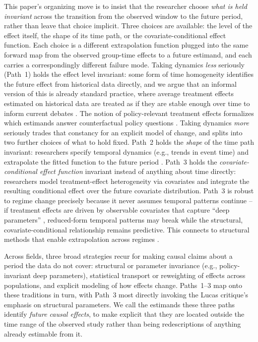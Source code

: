 \documentclass{article}
\begin{document}
This paper's organizing move is to insist that the researcher choose \emph{what is held invariant} across the transition from the observed window to the future period, rather than leave that choice implicit. Three choices are available: the level of the effect itself, the shape of its time path, or the covariate-conditional effect function. Each choice is a different extrapolation function plugged into the same forward map from the observed group-time effects to a future estimand, and each carries a correspondingly different failure mode. Taking dynamics \emph{less} seriously (Path~1) holds the effect level invariant: some form of time homogeneity identifies the future effect from historical data directly, and we argue that an informal version of this is already standard practice, where average treatment effects estimated on historical data are treated as if they are stable enough over time to inform current debates \citep{gablerDealingHeterogeneityTreatment2009,cintronHeterogeneousTreatmentEffects2022}. The notion of policy-relevant treatment effects formalizes which estimands answer counterfactual policy questions \citep{heckmanPolicyRelevantTreatmentEffects2001,sasakiEstimationInferencePolicy2023}. Taking dynamics \emph{more} seriously trades that constancy for an explicit model of change, and splits into two further choices of what to hold fixed. Path~2 holds the \emph{shape} of the time path invariant: researchers specify temporal dynamics (e.g., trends in event time) and extrapolate the fitted function to the future period \citep{khosrowiExtrapolationCausalEffects2019,maebaExtrapolationTreatmentEffect2024}. Path~3 holds the \emph{covariate-conditional effect function} invariant instead of anything about time directly: researchers model treatment-effect heterogeneity via covariates and integrate the resulting conditional effect over the future covariate distribution. Path~3 is robust to regime change precisely because it never assumes temporal patterns continue -- if treatment effects are driven by observable covariates that capture ``deep parameters'' \citep{lucasjrEconometricPolicyEvaluation1976}, reduced-form temporal patterns may break while the structural, covariate-conditional relationship remains predictive. This connects to structural methods that enable extrapolation across regimes \citep{heckmanStructuralEquationsTreatment2005,pearlExternalValidityCalculus2022}.

Across fields, three broad strategies recur for making causal claims about a period the data do not cover: structural or parameter invariance (e.g., policy-invariant deep parameters), statistical transport or reweighting of effects across populations, and explicit modeling of how effects change. Paths~1--3 map onto these traditions in turn, with Path~3 most directly invoking the Lucas critique's emphasis on structural parameters. We call the estimands these three paths identify \emph{future causal effects}, to make explicit that they are located outside the time range of the observed study rather than being redescriptions of anything already estimable from it.
\end{document}
